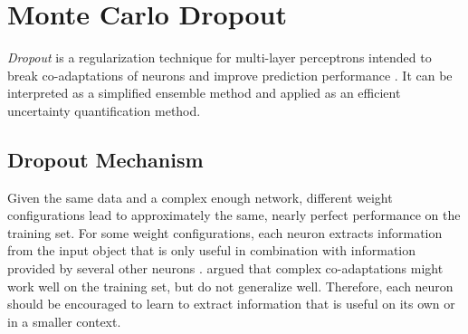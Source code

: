 \section{Monte Carlo Dropout}
\label{sec:mcd}

\emph{Dropout} is a regularization technique for multi-layer perceptrons intended to break co-adaptations of neurons and improve prediction performance \citep{hintonDropout2012}. It can be interpreted as a simplified ensemble method and applied as an efficient uncertainty quantification method.

\subsection{Dropout Mechanism}
\label{sec:dropout-mechanism}

Given the same data and a complex enough network, different weight configurations lead to approximately the same, nearly perfect performance on the training set. For some weight configurations, each neuron extracts information from the input object that is only useful in combination with information provided by several other neurons \citep{hintonDropout2012}. \cite{srivastavaDropout2014} argued that complex co-adaptations might work well on the training set, but do not generalize well. Therefore, each neuron should be encouraged to learn to extract information that is useful on its own or in a smaller context.

